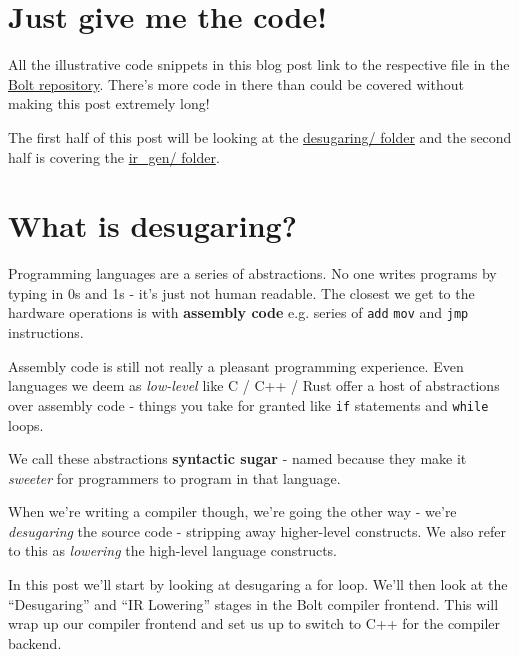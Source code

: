 \hypertarget{just-give-me-the-code}{%
\section{\texorpdfstring{\protect\hyperlink{just-give-me-the-code}{}Just
give me the
code!}{Just give me the code!}}\label{just-give-me-the-code}}

All the illustrative code snippets in this blog post link to the
respective file in the \href{https://github.com/mukul-rathi/bolt}{Bolt
repository}. There's more code in there than could be covered without
making this post extremely long!

The first half of this post will be looking at the
\href{https://github.com/mukul-rathi/bolt/tree/master/src/frontend/desugaring}{desugaring/
folder} and the second half is covering the
\href{https://github.com/mukul-rathi/bolt/tree/master/src/frontend/ir_gen}{ir\_gen/
folder}.

\hypertarget{what-is-desugaring}{%
\section{\texorpdfstring{\protect\hyperlink{what-is-desugaring}{}What
is desugaring?}{What is desugaring?}}\label{what-is-desugaring}}

Programming languages are a series of abstractions. No one writes
programs by typing in 0s and 1s - it's just not human readable. The
closest we get to the hardware operations is with \textbf{assembly code}
e.g. series of \texttt{add} \texttt{mov} and \texttt{jmp} instructions.

Assembly code is still not really a pleasant programming experience.
Even languages we deem as \emph{low-level} like C / C++ / Rust offer a
host of abstractions over assembly code - things you take for granted
like \texttt{if} statements and \texttt{while} loops.

We call these abstractions \textbf{syntactic sugar} - named because they
make it \emph{sweeter} for programmers to program in that language.

When we're writing a compiler though, we're going the other way - we're
\emph{desugaring} the source code - stripping away higher-level
constructs. We also refer to this as \emph{lowering} the high-level
language constructs.

In this post we'll start by looking at desugaring a for loop. We'll then
look at the ``Desugaring'' and ``IR Lowering'' stages in the Bolt
compiler frontend. This will wrap up our compiler frontend and set us up
to switch to C++ for the compiler backend.

